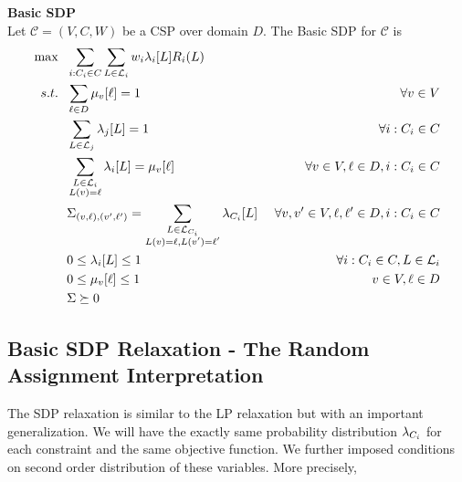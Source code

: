 \begin{definition}\textbf{Basic SDP} \\
Let $\mathcal{C} = (V,C,W)$ be a CSP over domain $D$. The Basic SDP for $\mathcal{C}$ is
\begin{alignat}{2}
\max ~&~ \sum_{i : C_i \in C} \sum_{L \in \mathcal{L}_i}   w_i\lambda_i[L] R_i(L) & \\
s.t. ~ & ~ \sum_{\ell \in D} \mu_v[\ell] = 1 & \forall v \in V  \label{eq:SDPmuSum} \\
     ~ & ~ \sum_{L \in \mathcal{L}_j} \lambda_j[L] = 1  & \forall i : C_i \in C \label{eq:SDPlambdaSum} \\
     ~ & ~ \sum_{\substack{ L \in \mathcal{L}_i \\ L(v) = \ell }} \lambda_i[L] = \mu_v[\ell]  & \forall v \in V, \ell \in D, i : C_i \in C \label{eq:SDPConsistency} \\
     ~ & ~ \Sigma_{\left(v, \ell\right),\left(v', \ell'\right)} = \sum_{\substack {L\in \mathcal{L}_{C_i}\\ L(v) = \ell, L(v')=\ell'} }\lambda_{C_i}[L] &~\forall v,v' \in V, \ell,\ell' \in D, i : C_i \in C \label{eq:SDPtiePSD}\\
     ~ & ~ 0 \leq \lambda_i[L] \leq 1  & \forall  i : C_i \in C, L \in \mathcal{L}_i  \label{eq:SDPlambdaNonNeg} \\
     ~ & ~ 0 \leq \mu_v[\ell] \leq 1 & v \in V, \ell \in D \label{eq:SDPmuNonNeg}\\
     ~ & ~ \Sigma \succeq 0& \label{eq:SDPPSD}
\end{alignat}
\end{definition}
\subsection{Basic SDP Relaxation - The Random Assignment Interpretation}

The SDP relaxation is similar to the LP relaxation but with an important generalization. 
We will have the exactly same probability distribution $\lambda_{C_i}$ for each constraint and the same objective function. 
We further imposed conditions on second order distribution of these variables. 
More precisely,

